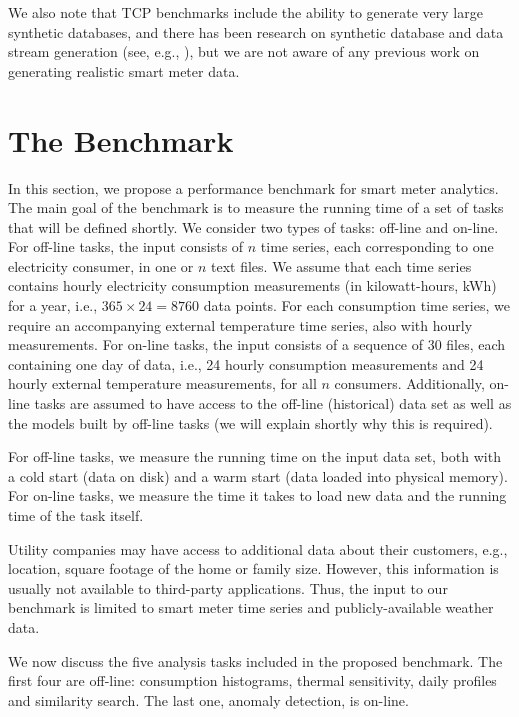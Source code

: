 \documentclass[prodmode,acmtods]{acmsmall}
\begin{document}
We also note that TCP benchmarks include the ability to generate very large synthetic databases, and there has been research on synthetic database and data stream generation (see, e.g., \cite{bc05,gzz+15}), but we are not aware of any previous work on generating realistic smart meter data.


\section{The Benchmark}
\label{sec:analyticsmethods}

In this section, we propose a performance benchmark for smart meter analytics.  The main goal of the benchmark is to measure the running time of a set of tasks that will be defined shortly.  We consider two types of tasks: off-line and on-line.  For off-line tasks, the input consists of $n$ time series, each corresponding to one electricity consumer, in one or $n$ text files.  We assume that each time series contains hourly electricity consumption measurements (in kilowatt-hours, kWh) for a year, i.e., $365 \times 24 = 8760$ data points.  For each consumption time series, we require an accompanying external temperature time series, also with hourly measurements.  For on-line tasks, the input consists of a sequence of 30 files, each containing one day of data, i.e., 24 hourly consumption measurements and 24 hourly external temperature measurements, for all $n$ consumers. Additionally, on-line tasks are assumed to have access to the off-line (historical) data set as well as the models built by off-line tasks (we will explain shortly why this is required).

For off-line tasks, we measure the running time on the input data set, both with a cold start (data on disk) and a warm start (data loaded into physical memory).  For on-line tasks, we measure the time it takes to load new data and the running time of the task itself.

Utility companies may have access to additional data about their customers, e.g., location, square footage of the home or family size.  However, this information is usually not available to third-party applications.  Thus, the input to our benchmark is limited to smart meter time series and publicly-available weather data.

We now discuss the five analysis tasks included in the proposed benchmark.  The first four are off-line: consumption histograms, thermal sensitivity, daily profiles and similarity search.  The last one, anomaly detection, is on-line.
\end{document}
